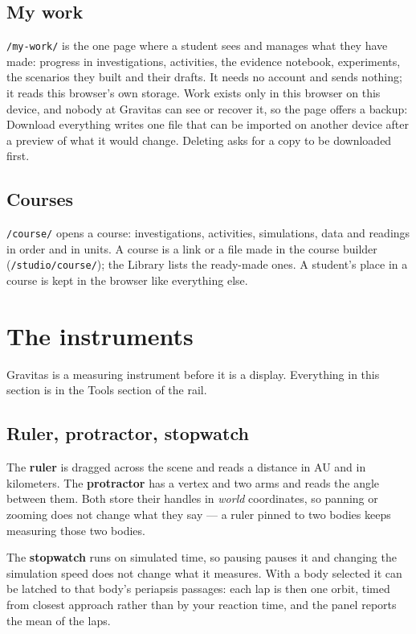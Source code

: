 \documentclass[11pt,a4paper]{article}
\newcommand{\ui}[1]{\textsf{#1}}
\begin{document}
\subsection{My work}

\texttt{/my-work/} is the one page where a student sees and manages what they
have made: progress in investigations, activities, the evidence notebook, experiments, the scenarios they built and their drafts. It
needs no account and sends nothing; it reads this browser's own storage. Work
exists only in this browser on this device, and nobody at Gravitas can see or
recover it, so the page offers a backup: \ui{Download everything} writes one file
that can be imported on another device after a preview of what it would change.
Deleting asks for a copy to be downloaded first.

\subsection{Courses}

\texttt{/course/} opens a course: investigations, activities, simulations, data
and readings in order and in units. A course is a link or a file made in the
course builder (\texttt{/studio/course/}); the Library lists the ready-made ones.
A student's place in a course is kept in the browser like everything else.

\section{The instruments}

Gravitas is a measuring instrument before it is a display. Everything in this
section is in the \ui{Tools} section of the rail.

\subsection{Ruler, protractor, stopwatch}

The \textbf{ruler} is dragged across the scene and reads a distance in AU and in
kilometers. The \textbf{protractor} has a vertex and two arms and reads the angle
between them. Both store their handles in \emph{world} coordinates, so panning or
zooming does not change what they say --- a ruler pinned to two bodies keeps
measuring those two bodies.

The \textbf{stopwatch} runs on simulated time, so pausing pauses it and changing
the simulation speed does not change what it measures. With a body selected it
can be latched to that body's periapsis passages: each lap is then one orbit,
timed from closest approach rather than by your reaction time, and the panel
reports the mean of the laps.
\end{document}
